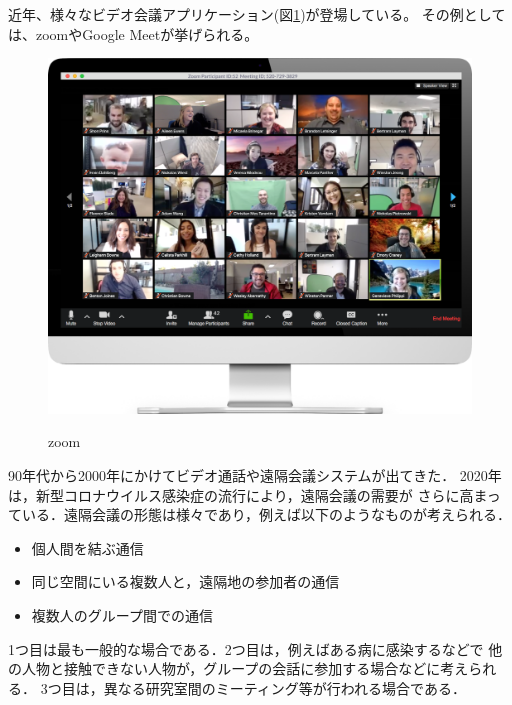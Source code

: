 近年、様々なビデオ会議アプリケーション(図\ref{fig:1})が登場している。
その例としては、zoom\cite{1}やGoogle Meet\cite{2}が挙げられる。

\begin{figure}[tbp]
  \centering
  \includegraphics[scale=0.5]{fig/zoom-monitor-screen.png}
  \caption{zoom}\label{fig:1}\cite{1}
\end{figure}

90年代から2000年にかけてビデオ通話や遠隔会議システムが出てきた．
2020年は，新型コロナウイルス感染症の流行により，遠隔会議の需要が
さらに高まっている．遠隔会議の形態は様々であり，例えば以下のようなものが考えられる．
\begin{itemize}
  \item 個人間を結ぶ通信
  \item 同じ空間にいる複数人と，遠隔地の参加者の通信
  \item 複数人のグループ間での通信
\end{itemize}

1つ目は最も一般的な場合である．2つ目は，例えばある病に感染するなどで
他の人物と接触できない人物が，グループの会話に参加する場合などに考えられる．
3つ目は，異なる研究室間のミーティング等が行われる場合である．

